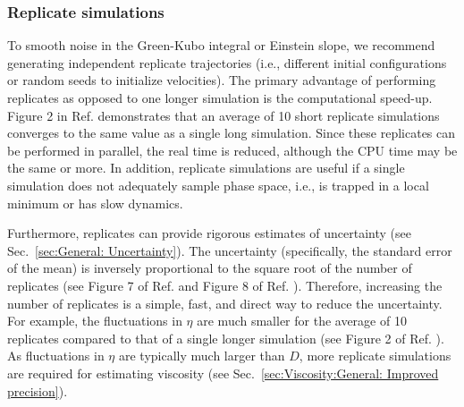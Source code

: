 \documentclass[9pt,bestpractices]{livecoms}
\begin{document}

\subsubsection{Replicate simulations} \label{sec:General: Replicate simulations}

To smooth noise in the Green-Kubo integral or Einstein slope, we recommend generating independent replicate trajectories (i.e., different initial configurations or random seeds to initialize velocities). The primary advantage of performing replicates as opposed to one longer simulation is the computational speed-up. Figure 2 in Ref. \cite{Payal2012} demonstrates that an average of 10 short replicate simulations converges to the same value as a single long simulation. Since these replicates can be performed in parallel, the real time is reduced, although the CPU time may be the same or more. In addition, replicate simulations are useful if a single simulation does not adequately sample phase space, i.e., is trapped in a local minimum or has slow dynamics.


Furthermore, replicates can provide rigorous estimates of uncertainty (see Sec.\ \ref{sec:General: Uncertainty}). The uncertainty (specifically, the standard error of the mean) is inversely proportional to the square root of the number of replicates (see Figure 7 of Ref. \cite{Zhang2015} and Figure 8 of Ref. \cite{Ma2017}). Therefore, increasing the number of replicates is a simple, fast, and direct way to reduce the uncertainty. For example, the fluctuations in $\eta$ are much smaller for the average of 10 replicates compared to that of a single longer simulation (see Figure 2 of Ref. \cite{Payal2012}). As fluctuations in $\eta$ are typically much larger than $D$, more replicate simulations are required for estimating viscosity (see Sec.\ \ref{sec:Viscosity:General: Improved precision}).
\end{document}
